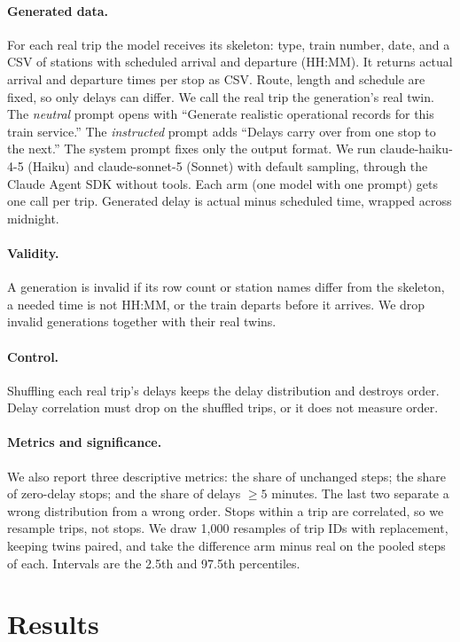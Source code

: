 \documentclass[11pt,a4paper]{article}
\begin{document}
\paragraph{Generated data.} For each real trip the model receives its skeleton: type, train number, date, and a CSV of stations with scheduled arrival and departure (HH:MM). It returns actual arrival and departure times per stop as CSV. Route, length and schedule are fixed, so only delays can differ. We call the real trip the generation's real twin. The \emph{neutral} prompt opens with ``Generate realistic operational records for this train service.'' The \emph{instructed} prompt adds ``Delays carry over from one stop to the next.'' The system prompt fixes only the output format. We run claude-haiku-4-5 (Haiku) and claude-sonnet-5 (Sonnet) with default sampling, through the Claude Agent SDK without tools. Each arm (one model with one prompt) gets one call per trip. Generated delay is actual minus scheduled time, wrapped across midnight.

\paragraph{Validity.} A generation is invalid if its row count or station names differ from the skeleton, a needed time is not HH:MM, or the train departs before it arrives. We drop invalid generations together with their real twins.

\paragraph{Control.} Shuffling each real trip's delays keeps the delay distribution and destroys order. Delay correlation must drop on the shuffled trips, or it does not measure order.

\paragraph{Metrics and significance.} We also report three descriptive metrics: the share of unchanged steps; the share of zero-delay stops; and the share of delays $\ge 5$ minutes. The last two separate a wrong distribution from a wrong order. Stops within a trip are correlated, so we resample trips, not stops. We draw 1{,}000 resamples of trip IDs with replacement, keeping twins paired, and take the difference arm minus real on the pooled steps of each. Intervals are the 2.5th and 97.5th percentiles.

\section{Results}
\end{document}
